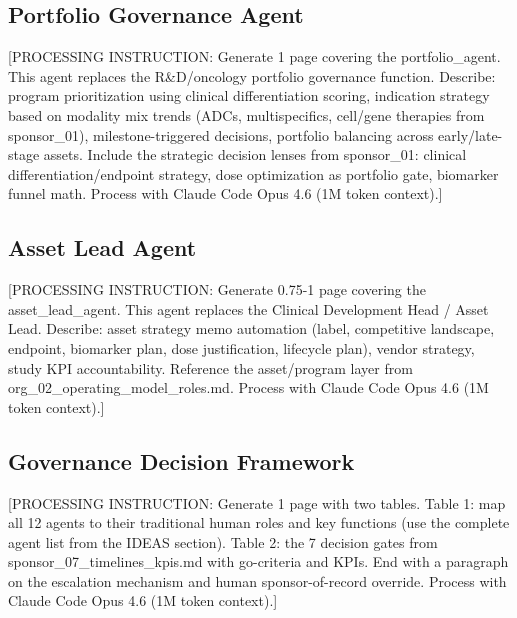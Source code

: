 \subsection{Portfolio Governance Agent}

[PROCESSING INSTRUCTION: Generate 1 page covering the portfolio\_agent. This agent replaces
the R\&D/oncology portfolio governance function. Describe: program prioritization using
clinical differentiation scoring, indication strategy based on modality mix trends
(ADCs, multispecifics, cell/gene therapies from sponsor\_01), milestone-triggered decisions,
portfolio balancing across early/late-stage assets. Include the strategic decision lenses
from sponsor\_01: clinical differentiation/endpoint strategy, dose optimization as portfolio
gate, biomarker funnel math. Process with Claude Code Opus 4.6 (1M token context).]

\subsection{Asset Lead Agent}

[PROCESSING INSTRUCTION: Generate 0.75-1 page covering the asset\_lead\_agent. This agent
replaces the Clinical Development Head / Asset Lead. Describe: asset strategy memo
automation (label, competitive landscape, endpoint, biomarker plan, dose justification,
lifecycle plan), vendor strategy, study KPI accountability. Reference the asset/program
layer from org\_02\_operating\_model\_roles.md. Process with Claude Code Opus 4.6
(1M token context).]

\subsection{Governance Decision Framework}

[PROCESSING INSTRUCTION: Generate 1 page with two tables. Table 1: map all 12 agents to their
traditional human roles and key functions (use the complete agent list from the IDEAS section).
Table 2: the 7 decision gates from sponsor\_07\_timelines\_kpis.md with go-criteria and KPIs.
End with a paragraph on the escalation mechanism and human sponsor-of-record override.
Process with Claude Code Opus 4.6 (1M token context).]
